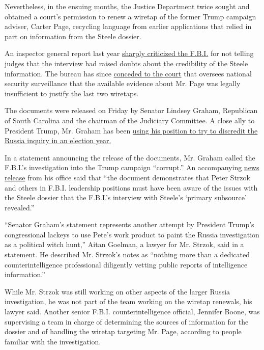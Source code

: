 Nevertheless, in the ensuing months, the Justice Department twice sought
and obtained a court's permission to renew a wiretap of the former Trump
campaign adviser, Carter Page, recycling language from earlier
applications that relied in part on information from the Steele dossier.

An inspector general report last year
\href{https://www.nytimes.com/2019/12/11/us/politics/fisa-surveillance-fbi.html}{sharply
criticized the F.B.I.} for not telling judges that the interview had
raised doubts about the credibility of the Steele information. The
bureau has since
\href{https://www.nytimes.com/2020/01/23/us/politics/carter-page-fbi-surveillance.html}{conceded
to the court} that oversees national security surveillance that the
available evidence about Mr. Page was legally insufficient to justify
the last two wiretaps.

The documents were released on Friday by Senator Lindsey Graham,
Republican of South Carolina and the chairman of the Judiciary
Committee. A close ally to President Trump, Mr. Graham has been
\href{https://www.nytimes.com/2020/06/11/us/politics/republicans-subpoena-russia-inquiry.html}{using
his position to try to discredit the Russia inquiry in an election
year.}

In a statement announcing the release of the documents, Mr. Graham
called the F.B.I.'s investigation into the Trump campaign ``corrupt.''
An accompanying
\href{https://www.judiciary.senate.gov/press/rep/releases/judiciary-committee-releases-declassified-documents-that-substantially-undercut-steele-dossier-page-fisa-warrants}{news
release} from his office said that ``the document demonstrates that
Peter Strzok and others in F.B.I. leadership positions must have been
aware of the issues with the Steele dossier that the F.B.I.'s interview
with Steele's `primary subsource' revealed.''

``Senator Graham's statement represents another attempt by President
Trump's congressional lackeys to use Pete's work product to paint the
Russia investigation as a political witch hunt,'' Aitan Goelman, a
lawyer for Mr. Strzok, said in a statement. He described Mr. Strzok's
notes as ``nothing more than a dedicated counterintelligence
professional diligently vetting public reports of intelligence
information.''

While Mr. Strzok was still working on other aspects of the larger Russia
investigation, he was not part of the team working on the wiretap
renewals, his lawyer said. Another senior F.B.I. counterintelligence
official, Jennifer Boone, was supervising a team in charge of
determining the sources of information for the dossier and of handling
the wiretap targeting Mr. Page, according to people familiar with the
investigation.

